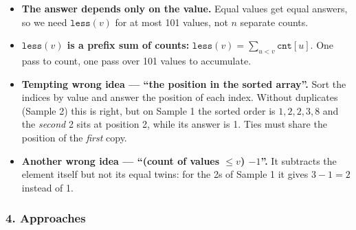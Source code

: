\begin{itemize}[leftmargin=*]
    \item \textbf{The answer depends only on the value.} Equal values get equal answers, so we need $\texttt{less}(v)$ for at most 101 values, not $n$ separate counts.
    \item \textbf{$\texttt{less}(v)$ is a prefix sum of counts:} $\texttt{less}(v) = \sum_{u < v} \texttt{cnt}[u]$. One pass to count, one pass over 101 values to accumulate.
    \item \textbf{Tempting wrong idea --- ``the position in the sorted array''.} Sort the indices by value and answer the position of each index. Without duplicates (Sample 2) this is right, but on Sample 1 the sorted order is $1, 2, 2, 3, 8$ and the \emph{second} 2 sits at position 2, while its answer is 1. Ties must share the position of the \emph{first} copy.
    \item \textbf{Another wrong idea --- ``(count of values $\le v$) $- 1$''.} It subtracts the element itself but not its equal twins: for the 2s of Sample 1 it gives $3 - 1 = 2$ instead of 1.
\end{itemize}

\begin{diagrambox}
\end{diagrambox}

\subsubsection*{4. Approaches}

